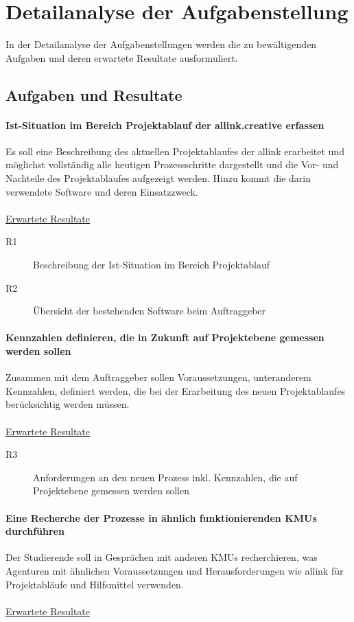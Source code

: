 \chapter{Detailanalyse der Aufgabenstellung}
In der Detailanalyse der Aufgabenstellungen werden die zu bewältigenden
Aufgaben und deren erwartete Resultate ausformuliert.

\section{Aufgaben und Resultate}
\subsubsection{Ist-Situation im Bereich Projektablauf der allink.creative erfassen}
Es soll eine Beschreibung des aktuellen Projektablaufes der allink erarbeitet
und möglichst vollständig alle heutigen Prozessschritte dargestellt und die Vor- 
und Nachteile des Projektablaufes aufgezeigt werden. Hinzu kommt die darin verwendete Software und
deren Einsatzzweck.
\\\\
\underline{Erwartete Resultate}

\begin{description}
    \item[R1] Beschreibung der Ist-Situation im Bereich Projektablauf
    \item[R2] Übersicht der bestehenden Software beim Auftraggeber
\end{description}

\subsubsection{Kennzahlen definieren, die in Zukunft auf Projektebene gemessen werden sollen}
Zusammen mit dem Auftraggeber sollen Voraussetzungen, unteranderem Kennzahlen,
definiert werden, die bei der Erarbeitung des neuen Projektablaufes berücksichtig
werden müssen. 
\\\\
\underline{Erwartete Resultate}

\begin{description}
    \item[R3] Anforderungen an den neuen Prozess inkl. Kennzahlen, die auf 
        Projektebene gemessen werden sollen
\end{description}
  
\subsubsection{Eine Recherche der Prozesse in ähnlich funktionierenden KMUs durchführen}
Der Studierende soll in Gesprächen mit anderen KMUs recherchieren, was Agenturen
mit ähnlichen Voraussetzungen und Herausforderungen wie allink für Projektabläufe
und Hilfsmittel verwenden.
\\\\
\underline{Erwartete Resultate}

